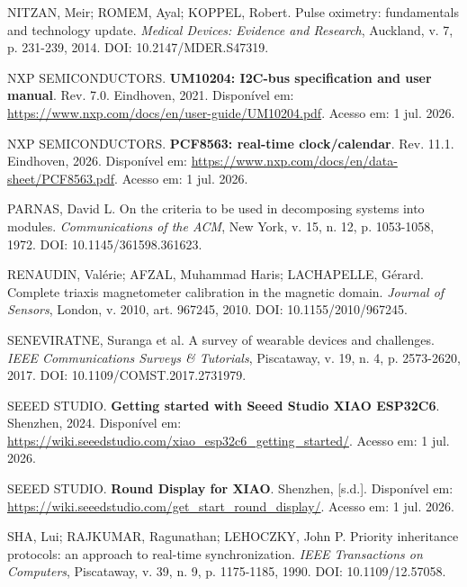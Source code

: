 \documentclass[a4paper,12pt]{article}
\begin{document}
\noindent NITZAN, Meir; ROMEM, Ayal; KOPPEL, Robert. Pulse oximetry: fundamentals and technology update. \emph{Medical Devices: Evidence and Research}, Auckland, v. 7, p. 231-239, 2014. DOI: 10.2147/MDER.S47319.\par\medskip

\noindent NXP SEMICONDUCTORS. \textbf{UM10204: I2C-bus specification and user manual}. Rev. 7.0. Eindhoven, 2021. Disponível em: \url{https://www.nxp.com/docs/en/user-guide/UM10204.pdf}. Acesso em: 1 jul. 2026.\par\medskip

\noindent NXP SEMICONDUCTORS. \textbf{PCF8563: real-time clock/calendar}. Rev. 11.1. Eindhoven, 2026. Disponível em: \url{https://www.nxp.com/docs/en/data-sheet/PCF8563.pdf}. Acesso em: 1 jul. 2026.\par\medskip

\noindent PARNAS, David L. On the criteria to be used in decomposing systems into modules. \emph{Communications of the ACM}, New York, v. 15, n. 12, p. 1053-1058, 1972. DOI: 10.1145/361598.361623.\par\medskip

\noindent RENAUDIN, Valérie; AFZAL, Muhammad Haris; LACHAPELLE, Gérard. Complete triaxis magnetometer calibration in the magnetic domain. \emph{Journal of Sensors}, London, v. 2010, art. 967245, 2010. DOI: 10.1155/2010/967245.\par\medskip

\noindent SENEVIRATNE, Suranga et al. A survey of wearable devices and challenges. \emph{IEEE Communications Surveys \& Tutorials}, Piscataway, v. 19, n. 4, p. 2573-2620, 2017. DOI: 10.1109/COMST.2017.2731979.\par\medskip

\noindent SEEED STUDIO. \textbf{Getting started with Seeed Studio XIAO ESP32C6}. Shenzhen, 2024. Disponível em: \url{https://wiki.seeedstudio.com/xiao_esp32c6_getting_started/}. Acesso em: 1 jul. 2026.\par\medskip

\noindent SEEED STUDIO. \textbf{Round Display for XIAO}. Shenzhen, [s.d.]. Disponível em: \url{https://wiki.seeedstudio.com/get_start_round_display/}. Acesso em: 1 jul. 2026.\par\medskip

\noindent SHA, Lui; RAJKUMAR, Ragunathan; LEHOCZKY, John P. Priority inheritance protocols: an approach to real-time synchronization. \emph{IEEE Transactions on Computers}, Piscataway, v. 39, n. 9, p. 1175-1185, 1990. DOI: 10.1109/12.57058.\par\medskip
\end{document}
